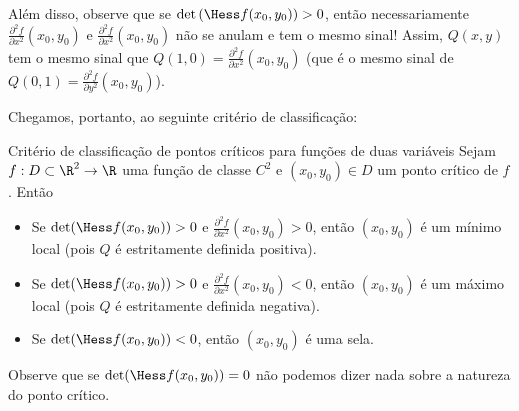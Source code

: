 
Além disso, observe que se $\det \left(\Hess f(x_0,y_0)\right)>0$, então necessariamente $ \frac{\partial^2f}{\partial x^2}(x_0,y_0)$ e $ \frac{\partial^2f}{\partial x^2}(x_0,y_0)$ não se anulam e tem o mesmo sinal! Assim, $Q(x,y)$ tem o mesmo sinal que $Q(1,0)=\frac{\partial^2f}{\partial x^2}(x_0,y_0)$ (que é o mesmo sinal de $Q(0,1)=\frac{\partial^2f}{\partial y^2}(x_0,y_0)$). 

Chegamos, portanto, ao seguinte critério de classificação:
\begin{theorem}{Critério de classificação de pontos críticos para funções de duas variáveis}{}
Sejam $f:D\subset \R^2\to\R$ uma função de classe $C^2$ e $(x_0,y_0)\in D$ um ponto crítico de $f$. Então
\begin{itemize}
\item Se $\det (\Hess f(x_0,y_0))>0$ e $\frac{\partial^2f}{\partial x^2}(x_0,y_0)>0$, então $(x_0,y_0)$ é um mínimo local (pois $Q$ é estritamente definida positiva).
\item Se $\det (\Hess f(x_0,y_0))>0$ e $\frac{\partial^2f}{\partial x^2}(x_0,y_0)<0$, então $(x_0,y_0)$ é um máximo local (pois $Q$ é estritamente definida negativa).
\item Se $\det (\Hess f(x_0,y_0))<0$, então $(x_0,y_0)$ é uma sela. 
\end{itemize}
\end{theorem}

Observe que se $\det (\Hess f(x_0,y_0))=0$ não podemos dizer nada sobre a natureza do ponto crítico. %

